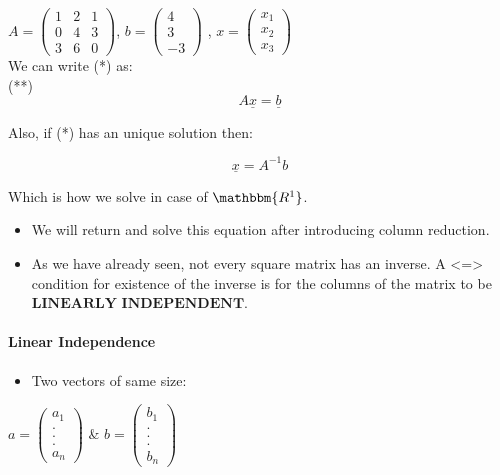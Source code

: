 \documentclass[]{article}
\providecommand{\tightlist}{%
  \setlength{\itemsep}{0pt}\setlength{\parskip}{0pt}}
\let\oldparagraph\paragraph
\renewcommand{\paragraph}[1]{\oldparagraph{#1}\mbox{}}
\begin{document}
\(A=\begin{pmatrix} 1 & 2 & 1\\ 0 & 4 & 3 \\ 3 & 6 & 0\end{pmatrix}\),
\(b=\begin{pmatrix} 4\\ 3 \\-3\end{pmatrix}\) ,
\(x=\begin{pmatrix} x_1\\ x_2 \\x_3\end{pmatrix}\)\\

We can write (*) as:\\[2\baselineskip] (**)
\[A\underline{x}=\underline{b}\]

Also, if (*) has an unique solution then:

\[\underline{x}=A^{-1}b\]

Which is how we solve in case of \(\mathbbm{R^1}\).\\

\begin{itemize}
\item
  We will return and solve this equation after introducing column
  reduction.
\item
  As we have already seen, not every square matrix has an inverse. A
  \textless{}=\textgreater{} condition for existence of the inverse is
  for the columns of the matrix to be
  \(\textbf{LINEARLY INDEPENDENT}\).\\
\end{itemize}

\paragraph{\texorpdfstring{Linear Independence\\
}{Linear Independence }}\label{linear-independence}

\begin{itemize}
\tightlist
\item
  Two vectors of same size:\\
\end{itemize}

\(a=\begin{pmatrix} a_1 \\ .\\ .\\.\\a_n \end{pmatrix}\) \&
\(b=\begin{pmatrix} b_1 \\ .\\ .\\.\\b_n \end{pmatrix}\)\\
\end{document}
